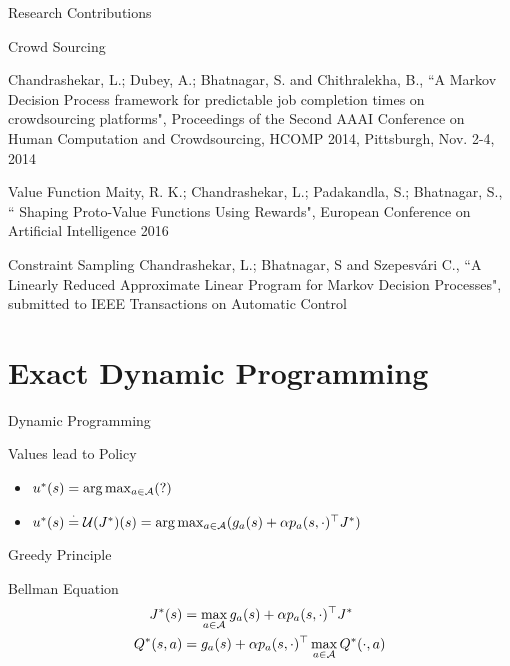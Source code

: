 \documentclass[10pt,handout]{beamer}
\begin{document}
\begin{frame}[fragile]{Research Contributions}
\begin{block}{Crowd Sourcing}

Chandrashekar, L.;  Dubey, A.; Bhatnagar, S. and Chithralekha, B., ``A Markov Decision Process framework for predictable job completion times on crowdsourcing platforms", Proceedings of the Second {AAAI} Conference on Human Computation and Crowdsourcing, {HCOMP} 2014, Pittsburgh, Nov. 2-4, 2014
\end{block}
\begin{block}{Value Function}
Maity, R. K.; Chandrashekar, L.;  Padakandla, S.; Bhatnagar, S., `` Shaping Proto-Value Functions Using Rewards", European Conference on Artificial Intelligence 2016\\
\end{block}
\begin{block}{Constraint Sampling}
Chandrashekar, L.;  Bhatnagar, S and Szepesv\'{a}ri C., ``A Linearly Reduced Approximate Linear Program for Markov Decision Processes", submitted to IEEE Transactions on Automatic Control
\end{block}

\end{frame}



\section{Exact Dynamic Programming}

\begin{frame}[fragile]{Dynamic Programming}
\begin{block}{Values lead to Policy}
\begin{itemize}
\item$u^*(s)=\arg\max_{a\in \mathcal{A}}(?)$
\item $u^*(s)\stackrel{\cdot}{=} \mathcal{U}(J^*)(s) =\arg\max_{a\in \mathcal{A}} (g_a(s)+\alpha p_a(s,\cdot)^\top J^*)$
\end{itemize}
\end{block}
\begin{block}{Greedy Principle}
{\color{orange}{Best = Current Best+ Future Best}}
\end{block}
\begin{block}{Bellman Equation}
\begin{align*}
J^*(s)&=\max_{a\in \mathcal{A}} g_a(s)+\alpha p_a(s,\cdot)^\top J^*\\
Q^*(s,a)&= g_a(s)+\alpha p_a(s,\cdot)^\top \max_{a\in \mathcal{A}} Q^*(\cdot,a)
\end{align*}
\end{block}



\end{frame}
\end{document}
